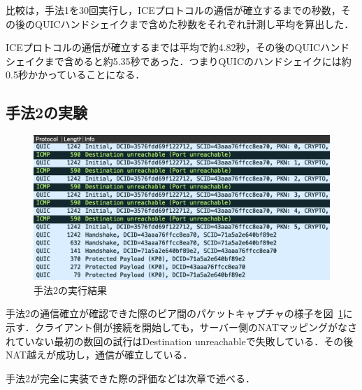比較は，手法1を30回実行し，ICEプロトコルの通信が確立するまでの秒数，その後のQUICハンドシェイクまで含めた秒数をそれぞれ計測し平均を算出した．

ICEプロトコルの通信が確立するまでは平均で約4.82秒，その後のQUICハンドシェイクまで含めると約5.35秒であった．つまりQUICのハンドシェイクには約0.5秒かかっていることになる．

\subsection{手法2の実験}
\begin{figure}[h]
  \centering
  \includegraphics[width=\linewidth]{figs/quic-eva.png}
  \caption{手法2の実行結果}
  \label{fig:eva-2}
\end{figure}

手法2の通信確立が確認できた際のピア間のパケットキャプチャの様子を図~\ref{fig:eva-2}に示す．クライアント側が接続を開始しても，サーバー側のNATマッピングがなされていない最初の数回の試行はDestination unreachableで失敗している．その後NAT越えが成功し，通信が確立している．

手法2が完全に実装できた際の評価などは次章で述べる．
